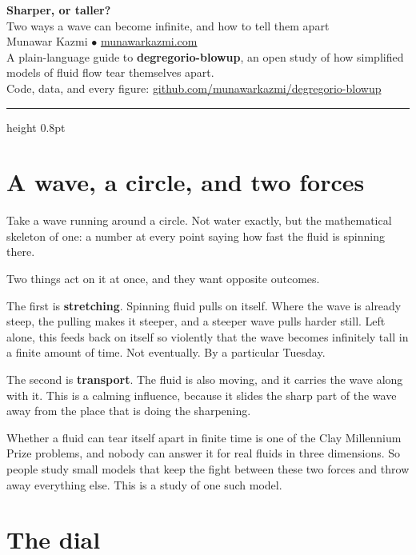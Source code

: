 \documentclass[11pt,a4paper]{article}
\begin{document}
\begin{center}
  {\LARGE\bfseries\color{headingblue} Sharper, or taller?}\\[6pt]
  {\large Two ways a wave can become infinite, and how to tell them apart}\\[12pt]
  {\normalsize Munawar Kazmi \quad$\bullet$\quad
  \href{https://munawarkazmi.com}{munawarkazmi.com}}\\[6pt]
  {\normalsize A plain-language guide to \textbf{degregorio-blowup}, an open
  study of how simplified models of fluid flow tear themselves apart.}\\[4pt]
  {\normalsize Code, data, and every figure:
  \href{https://github.com/munawarkazmi/degregorio-blowup}%
  {github.com/munawarkazmi/degregorio-blowup}}
\end{center}

\vspace{4pt}
{\color{rulegold}\hrule height 0.8pt}
\vspace{10pt}

\section{A wave, a circle, and two forces}

Take a wave running around a circle. Not water exactly, but the mathematical
skeleton of one: a number at every point saying how fast the fluid is spinning
there.

Two things act on it at once, and they want opposite outcomes.

The first is \textbf{stretching}. Spinning fluid pulls on itself. Where the
wave is already steep, the pulling makes it steeper, and a steeper wave pulls
harder still. Left alone, this feeds back on itself so violently that the wave
becomes infinitely tall in a finite amount of time. Not eventually. By a
particular Tuesday.

The second is \textbf{transport}. The fluid is also moving, and it carries the
wave along with it. This is a calming influence, because it slides the sharp
part of the wave away from the place that is doing the sharpening.

Whether a fluid can tear itself apart in finite time is one of the Clay
Millennium Prize problems, and nobody can answer it for real fluids in three
dimensions. So people study small models that keep the fight between these two
forces and throw away everything else. This is a study of one such model.

\section{The dial}
\end{document}
